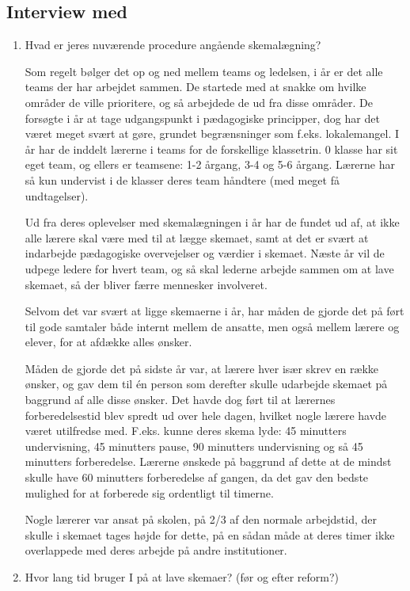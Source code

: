 \subsection{Interview med \school}
\begin{enumerate}
	\item Hvad er jeres nuværende procedure angående skemalægning?

	Som regelt bølger det op og ned mellem teams og ledelsen, i år er det alle teams der har arbejdet sammen. De startede med at snakke om hvilke områder de ville prioritere, og så arbejdede de ud fra disse områder. De forsøgte i år at tage udgangspunkt i pædagogiske principper, dog har det været meget svært at gøre, grundet begrænsninger som f.eks. lokalemangel. I år har de inddelt lærerne i teams for de forskellige klassetrin. 0 klasse har sit eget team, og ellers er teamsene: 1-2 årgang, 3-4 og 5-6 årgang. Lærerne har så kun undervist i de klasser deres team håndtere (med meget få undtagelser).

	Ud fra deres oplevelser med skemalægningen i år har de fundet ud af, at ikke alle lærere skal være med til at lægge skemaet, samt at det er svært at indarbejde pædagogiske overvejelser og værdier i skemaet. Næste år vil de udpege ledere for hvert team, og så skal lederne arbejde sammen om at lave skemaet, så der bliver færre mennesker involveret.

	Selvom det var svært at ligge skemaerne i år, har måden de gjorde det på ført til gode samtaler både internt mellem de ansatte, men også mellem lærere og elever, for at afdække alles ønsker.

	Måden de gjorde det på sidste år var, at lærere hver især skrev en række ønsker, og gav dem til \'en person som derefter skulle udarbejde skemaet på baggrund af alle disse ønsker. Det havde dog ført til at lærernes forberedelsestid blev spredt ud over hele dagen, hvilket nogle lærere havde været utilfredse med. F.eks. kunne deres skema lyde: 45 minutters undervisning, 45 minutters pause, 90 minutters undervisning og så 45 minutters forberedelse. Lærerne ønskede på baggrund af dette at de mindst skulle have 60 minutters forberedelse af gangen, da det gav den bedste mulighed for at forberede sig ordentligt til timerne.

	Nogle lærerer var ansat på skolen, på 2/3 af den normale arbejdstid, der skulle i skemaet tages højde for dette, på en sådan måde at deres timer ikke overlappede med deres arbejde på andre institutioner.

	
	\item Hvor lang tid bruger I på at lave skemaer? (før og efter reform?)


\end{enumerate}
